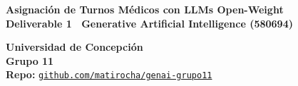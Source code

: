 \documentclass[9.5pt,a4paper]{extarticle}
\begin{document}
\begin{tcolorbox}[colback=boxbg,colframe=boxframe,arc=1.5mm,boxrule=0.8pt,top=3pt,bottom=3pt,left=8pt,right=8pt]
\begin{minipage}[c]{0.68\textwidth}
    {\fontsize{12}{13.5}\selectfont \textbf{Asignación de Turnos Médicos con LLMs Open-Weight}}\\[1.5pt]
    {\fontsize{8.5}{9.8}\selectfont \textbf{Deliverable 1 \textbar\ Generative Artificial Intelligence (580694)}}
\end{minipage}
\hfill
\begin{minipage}[c]{0.30\textwidth}
    \raggedleft
    {\fontsize{8}{9}\selectfont \textbf{Universidad de Concepción}}\\
    {\fontsize{8.5}{9.5}\selectfont \textbf{Grupo 11}}\\
    {\fontsize{7}{8}\selectfont \textbf{Repo:} \href{https://github.com/matirocha/genai-grupo11}{\texttt{github.com/matirocha/genai-grupo11}}}
\end{minipage}
\end{tcolorbox}

\vspace{-2pt}
\end{document}
